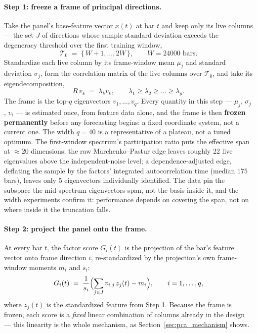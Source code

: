 \paragraph{Step 1: freeze a frame of principal directions.}
Take the panel's base-feature vector $x(t)$ at bar $t$ and keep only its
live columns --- the set $J$ of directions whose sample standard deviation
exceeds the degeneracy threshold over the first training window,
\[
\mathcal{T}_0 \;=\; \{\, W+1, \dots, 2W \,\},
\qquad W = 24000 \text{ bars}.
\]
Standardize each live column by its frame-window mean $\mu_j$ and standard
deviation $\sigma_j$, form the correlation matrix of the live columns over
$\mathcal{T}_0$, and take its eigendecomposition,
\[
R\, v_k \;=\; \lambda_k v_k,
\qquad \lambda_1 \ge \lambda_2 \ge \dots \ge \lambda_p .
\]
The frame is the top-$q$ eigenvectors $v_1, \dots, v_q$. Every quantity in
this step --- $\mu_j$, $\sigma_j$, $v_i$ --- is estimated once, from
feature data alone, and the frame is then \textbf{frozen permanently}
before any forecasting begins: a fixed coordinate system, not a current
one. The width $q = 40$ is a representative of a plateau, not a tuned
optimum. The first-window spectrum's participation ratio puts the
effective span at $\approx 20$ dimensions; the raw Marchenko--Pastur edge
leaves roughly 22 live eigenvalues above the independent-noise level; a
dependence-adjusted edge, deflating the sample by the factors' integrated
autocorrelation time (median $175$ bars), leaves only 5 eigenvectors
individually identified. The data pin the subspace the mid-spectrum
eigenvectors span, not the basis inside it, and the width experiments
confirm it: performance depends on covering the span, not on where inside
it the truncation falls.

\paragraph{Step 2: project the panel onto the frame.}
At every bar $t$, the factor score $G_i(t)$ is the projection of the
bar's feature vector onto frame direction $i$, re-standardized by the
projection's own frame-window moments $m_i$ and $s_i$:
\[
G_i(t) \;=\; \frac{1}{s_i} \Bigl( \sum_{j \in J} v_{i,j}\, z_j(t) - m_i \Bigr),
\qquad i = 1, \dots, q,
\]
where $z_j(t)$ is the standardized feature from Step 1. Because the frame
is frozen, each score is a \emph{fixed} linear combination of columns
already in the design --- this linearity is the whole mechanism, as
Section~\ref{sec:pca_mechanism} shows.


